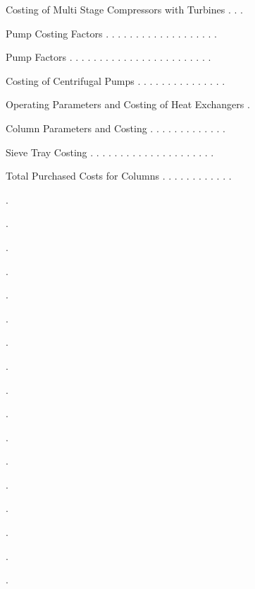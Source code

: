 \documentclass[a4paper,portrait,12pt]{article}
\begin{document}
\begin{flushleft}
Costing of Multi Stage Compressors with Turbines . . .
\end{flushleft}


\begin{flushleft}
Pump Costing Factors . . . . . . . . . . . . . . . . . . .
\end{flushleft}


\begin{flushleft}
Pump Factors . . . . . . . . . . . . . . . . . . . . . . . .
\end{flushleft}


\begin{flushleft}
Costing of Centrifugal Pumps . . . . . . . . . . . . . . .
\end{flushleft}


\begin{flushleft}
Operating Parameters and Costing of Heat Exchangers .
\end{flushleft}


\begin{flushleft}
Column Parameters and Costing . . . . . . . . . . . . .
\end{flushleft}


\begin{flushleft}
Sieve Tray Costing . . . . . . . . . . . . . . . . . . . . .
\end{flushleft}


\begin{flushleft}
Total Purchased Costs for Columns . . . . . . . . . . . .
\end{flushleft}





.


.


.


.


.


.


.


.


.


.


.


.


.





.


.


.


.
\end{document}
